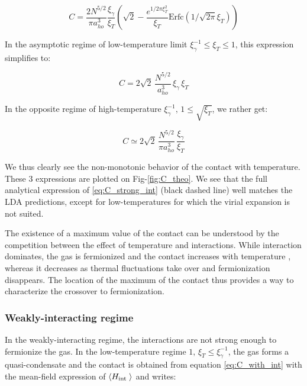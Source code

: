 \begin{equation}
    C = \frac{2 N^{5/2}}{\pi a_{ho}^3} \frac{\xi_\gamma}{\xi_T} \left( \sqrt{2} - \frac{e^{1/2 \pi \xi_T^2}}{\xi_T} \textrm{Erfc}(1/\sqrt{2 \pi} \xi_T) \right)
    \label{eq:C_strong_int}
\end{equation}

In the asymptotic regime of low-temperature limit $\xi_\gamma^{-1} \leq \xi_T \leq 1$, this expression simplifies to:

\begin{equation}
    C = 2 \sqrt{2} \, \frac{N^{5/2}}{a_{ho}^3} \, \xi_\gamma \, \xi_T 
    \label{eq:strong_int_lowT}
\end{equation}

\noindent In the opposite regime of high-temperature $\xi_\gamma^{-1}, \, 1 \leq \sqrt{\xi_T}$, we rather get:

\begin{equation}
    C \simeq 2 \sqrt{2} \, \frac{N^{5/2}}{ \pi a_{ho}^3} \, \frac{\xi_\gamma}{\xi_T} 
    \label{eq:strong_int_highT}
\end{equation}

\noindent We thus clearly see the non-monotonic behavior of the contact with temperature. These 3 expressions are plotted on Fig-\ref{fig:C_theo}. We see that the full analytical expression of \ref{eq:C_strong_int} (black dashed line) well matches the LDA predictions, except for low-temperatures for which the virial expansion is not suited.

The existence of a maximum value of the contact can be understood by the competition between the effect of temperature and interactions. While interaction dominates, the gas is fermionized and the contact increases with temperature \cite{vignolo2013universal}, whereas it decreases as thermal fluctuations take over and fermionization disappears. The location of the maximum of the contact thus provides a way to characterize the crossover to fermionization. 

\subsubsection{Weakly-interacting regime}

In the weakly-interacting regime, the interactions are not strong enough to fermionize the gas. In the low-temperature regime $1, \, \xi_T \leq \xi_\gamma^{-1}$, the gas forms a quasi-condensate and the contact is obtained from equation \ref{eq:C_with_int} with the mean-field expression of $\left\langle H_{\text {int }}\right\rangle$ and writes:

